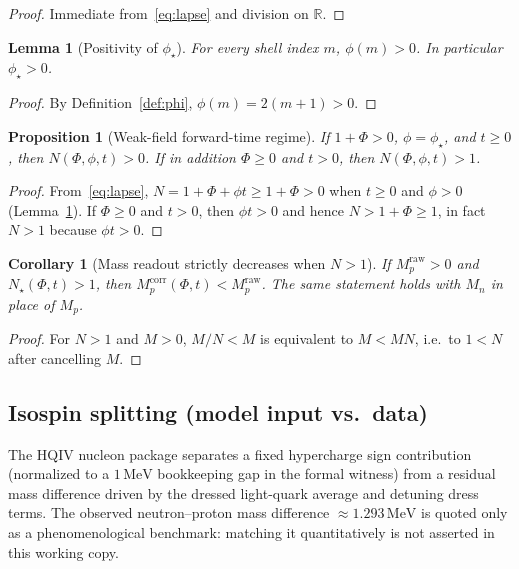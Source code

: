 \documentclass[11pt,a4paper]{article}
\theoremstyle{plain}
\newtheorem{lemma}[theorem]{Lemma}
\newtheorem{proposition}[theorem]{Proposition}
\newtheorem{corollary}[theorem]{Corollary}
\theoremstyle{definition}
\theoremstyle{remark}
\theoremstyle{plain}
\theoremstyle{definition}
\begin{document}
\begin{proof}
Immediate from~\eqref{eq:lapse} and division on $\mathbb{R}$.
\end{proof}

\begin{lemma}[Positivity of $\phi_{\star}$]\label{lem:phipos}
For every shell index $m$, $\phi(m)>0$.
In particular $\phi_{\star}>0$.
\end{lemma}

\begin{proof}
By Definition~\ref{def:phi}, $\phi(m)=2(m+1)>0$.
\end{proof}

\begin{proposition}[Weak-field forward-time regime]\label{prop:Npos}
If $1+\Phi>0$, $\phi=\phi_{\star}$, and $t\ge 0$, then $N(\Phi,\phi,t)>0$.
If in addition $\Phi\ge 0$ and $t>0$, then $N(\Phi,\phi,t)>1$.
\end{proposition}

\begin{proof}
From~\eqref{eq:lapse}, $N=1+\Phi+\phi t\ge 1+\Phi>0$ when $t\ge 0$ and $\phi>0$ (Lemma~\ref{lem:phipos}).
If $\Phi\ge 0$ and $t>0$, then $\phi t>0$ and hence $N>1+\Phi\ge 1$, in fact $N>1$ because $\phi t>0$.
\end{proof}

\begin{corollary}[Mass readout strictly decreases when $N>1$]\label{cor:mono}
If $M_p^{\mathrm{raw}}>0$ and $N_{\star}(\Phi,t)>1$, then $M_p^{\mathrm{corr}}(\Phi,t)<M_p^{\mathrm{raw}}$.
The same statement holds with $M_n$ in place of $M_p$.
\end{corollary}

\begin{proof}
For $N>1$ and $M>0$, $M/N<M$ is equivalent to $M<MN$, i.e.\ to $1<N$ after cancelling $M$.
\end{proof}

\subsection{Isospin splitting (model input vs.\ data)}

The HQIV nucleon package separates a fixed hypercharge sign contribution (normalized to a $1\,\mathrm{MeV}$ bookkeeping gap in the formal witness) from a residual mass difference driven by the dressed light-quark average and detuning dress terms.
The observed neutron--proton mass difference $\approx 1.293\,\mathrm{MeV}$ is quoted only as a phenomenological benchmark: matching it quantitatively is not asserted in this working copy.
\end{document}
